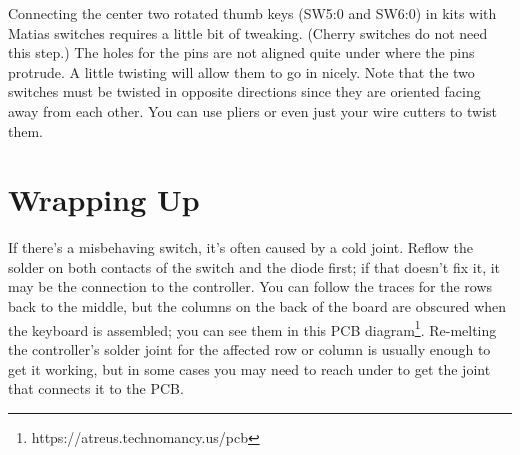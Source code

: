 \documentclass{article}
\begin{document}
\vspace{1em}
\noindent{}
\vspace{1em}



Connecting the center two rotated thumb keys (SW5:0 and SW6:0) in kits
with Matias switches requires a little bit of tweaking. (Cherry
switches do not need this step.) The holes for the pins are not
aligned quite under where the pins protrude. A little twisting will
allow them to go in nicely. Note that the two switches must be twisted
in opposite directions since they are oriented facing away from each
other. You can use pliers or even just your wire cutters to twist
them.

\section{Wrapping Up}

If there's a misbehaving switch, it's often caused by a cold
joint. Reflow the solder on both contacts of the switch and the diode
first; if that doesn't fix it, it may be the connection to the
controller. You can follow the traces for the rows back to the middle,
but the columns on the back of the board are obscured when the
keyboard is assembled; you can see them in this PCB
diagram\footnote{https://atreus.technomancy.us/pcb}.
Re-melting the controller's solder joint for the affected row or
column is usually enough to get it working, but in some cases you may
need to reach under to get the joint that connects it to the PCB.
\end{document}
